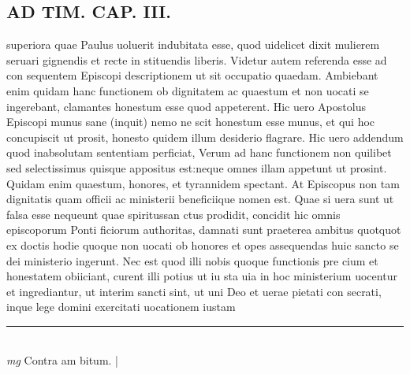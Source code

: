 \documentclass{article}
\begin{document}
\begin{pages}
\section*{AD TIM. CAP. III. }
\marginpar{[ p.123 ]}\pstart superiora quae Paulus uoluerit indubitata esse, quod uidelicet dixit mulierem seruari gignendis et recte in stituendis liberis. Videtur autem referenda esse ad con sequentem Episcopi descriptionem ut sit occupatio quaedam. Ambiebant enim quidam hanc functionem ob dignitatem ac quaestum et non uocati se ingerebant, clamantes honestum esse quod appeterent. Hic uero Apostolus Episcopi munus sane (inquit) nemo ne scit honestum esse munus, et qui hoc concupiscit ut prosit, honesto quidem illum desiderio flagrare. Hic uero addendum quod inabsolutam sententiam perficiat, Verum ad hanc functionem non quilibet sed selectissimus quisque appositus est:neque omnes illam appetunt ut prosint. Quidam enim quaestum, honores, et tyrannidem spectant. At Episcopus non tam dignitatis quam officii ac ministerii beneficiique nomen est. Quae si uera sunt ut falsa esse nequeunt quae spiritussan ctus prodidit, concidit hic omnis episcoporum Ponti ficiorum authoritas, damnati sunt praeterea ambitus quotquot ex doctis hodie quoque non uocati ob honores et opes assequendas huic sancto se dei ministerio ingerunt. Nec est quod illi nobis quoque functionis pre cium et honestatem obiiciant, curent illi potius ut iu sta uia in hoc ministerium uocentur et ingrediantur, ut interim sancti sint, ut uni Deo et uerae pietati con secrati, inque lege domini exercitati uocationem iustam  \pend
\vspace{0.5cm}\noindent
\vspace{0.2cm}\rule{1cm}{0.2pt}\\ 
\hspace{0.2cm}\textit{mg}
\footnotesize Contra am bitum. 
\normalsize| 

\end{pages}
\end{document}
